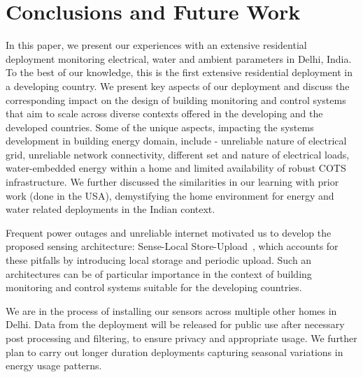 \documentclass[10pt]{sensys-proc}
\newcommand{\paradigms}{Sense-Local Store-Upload~}
\begin{document}
\section{Conclusions and Future Work}
In this paper, we present our experiences with an extensive residential deployment monitoring electrical, water and ambient parameters in Delhi, India. To the best of our knowledge, this is the first extensive residential deployment in a developing country. We present key aspects of our deployment and discuss the corresponding impact on the design of building monitoring and control systems that aim to scale across diverse contexts offered in the developing and the developed countries. Some of the unique aspects, impacting the systems development in building energy domain, include - unreliable nature of electrical grid, unreliable network connectivity, different set and nature of electrical loads, water-embedded energy within a home and limited availability of robust COTS infrastructure. We further discussed the similarities in our learning with prior work (done in the USA), demystifying the home environment for energy and water related deployments in the Indian context. %

Frequent power outages and unreliable internet motivated us to develop the proposed sensing architecture: \paradigms, which accounts for these pitfalls by introducing local storage and periodic upload. Such an architectures can be of particular importance in the context of building monitoring and control systems suitable for the developing countries. 

We are in the process of installing our sensors across multiple other homes in Delhi. Data from the deployment will be released for public use after necessary post processing and filtering, to ensure privacy and appropriate usage. We further plan to carry out longer duration deployments capturing seasonal variations in energy usage patterns. %

\balance

 
\end{document}
